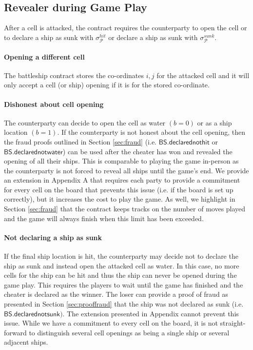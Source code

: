 \documentclass{llncs}
\newcommand{\participant}{\mathcal{P}}
\newcommand{\battleshipdeclarednotsunk}{\mathsf{BS.declarednotsunk}}
\newcommand{\battleshipdeclarednothit}{\mathsf{BS.declarednothit}}
\newcommand{\battleshipdeclarednotwater}{\mathsf{BS.declarednotwater}}
\begin{document}
\subsection{Revealer during Game Play} 
After a cell is attacked, the contract requires the counterparty to open the cell or to declare a ship as sunk with $\sigma^{hit}_{\participant}$ or declare a ship as sunk with  $\sigma^{sunk}_{\participant}$.

\paragraph{Opening a different cell}
The battleship contract stores the co-ordinates $i,j$ for the attacked cell and it will only accept a cell (or ship) opening if it is for the stored co-ordinate. 

\paragraph{Dishonest about cell opening}
The counterparty can decide to open the cell as water $(b=0)$ or as a ship location $(b=1)$. 
If the counterparty is not honest about the cell opening, then the fraud proofs outlined in Section \ref{sec:fraud} (i.e. $\battleshipdeclarednothit$ or $\battleshipdeclarednotwater$) can be used after the cheater has won and revealed the opening of all their ships. 
This is comparable to playing the game in-person as the counterparty is not forced to reveal all ships until the game's end. 
We provide an extension in Appendix A that requires each party to provide a commitment for every cell on the board that prevents this issue (i.e. if the board is set up correctly), but it increases the cost to play the game. 
As well, we highlight in Section \ref{sec:fraud} that the contract keeps tracks on the number of moves played and the game will always finish when this limit has been exceeded. 

\paragraph{Not declaring a ship as sunk}
If the final ship location is hit, the counterparty may decide not to declare the ship as sunk and instead open the attacked cell as water.  
In this case, no more cells for the ship can be hit and thus the ship can never be opened during the game play. 
This requires the players to wait until the game has finished and the cheater is declared as the winner. 
The loser can provide a proof of fraud as presented in Section \ref{sec:prooffraud} that the ship was not declared as sunk (i.e. $\battleshipdeclarednotsunk)$. 
The extension presented in Appendix cannot prevent this issue.
While we have a commitment to every cell on the board, it is not straight-forward to distinguish several cell openings as being a single ship or several adjacent ships. 
\end{document}
